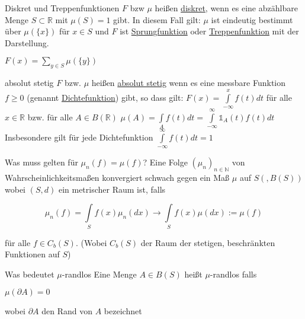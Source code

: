 \documentclass[avery5371,grid,frame]{flashcards} %
\newcommand{\N}{\mathbb{N}}
\newcommand{\R}{\mathbb{R}}
\newcommand{\1}{ \mathbb{1} } %
\begin{document}
\begin{flashcard}[Definition]{Diskret und Treppenfunktionen}
  $F$ bzw $\mu$ heißen \underline{diskret}, wenn es eine abzählbare
  Menge $S \subset \R$ mit $\mu(S)=1$ gibt. In diesem Fall gilt: $\mu$
  ist eindeutig bestimmt über $\mu(\{x\})$ für $x \in S$ und $F$ ist
  \underline{Sprungfunktion} oder \underline{Treppenfunktion} mit der
  Darstellung.
  \begin{center}
    $F(x)=\sum\limits_{y \in S} \mu(\{y\})$
  \end{center}
\end{flashcard}

\begin{flashcard}[Definition]{absolut stetig}
  $F$ bzw. $\mu$ heißen \underline{absolut stetig} wenn es eine
  messbare Funktion $f\geq 0$ (genannt \underline{Dichtefunktion})
  gibt, so dass gilt:
    $F(x)=\int\limits_{-\infty}^xf(t)dt$ für alle $x \in \R$
  bzw. für alle $A \in B(\R)$
    $\mu(A)=\int\limits_A f(t) dt=\int\limits_{-\infty}^\infty
    \1_A(t)f(t)dt$
  Insbesondere gilt für jede Dichtefunktion
    $\int\limits_{-\infty}^\infty f(t)dt=1$
\end{flashcard}

\begin{flashcard}[Definition]{Was muss gelten für $\mu_n(f) = \mu(f)$?}
  Eine Folge $(\mu_n)_{n \in \N}$ von Wahrscheinlichkeitsmaßen konvergiert schwach
  gegen ein Maß $\mu$ auf $S(,B(S))$ wobei $(S,d)$ ein metrischer Raum
  ist, falls
  \begin{center}
    \[\mu_n(f)=\int\limits_S f(x)\mu_n(dx) \to
    \int\limits_Sf(x)\mu(dx):=\mu(f)\]
  \end{center}
  für alle $f \in C_b(S)$. (Wobei $C_b(S)$ der Raum der stetigen, beschränkten Funktionen auf $S$)
\end{flashcard}

\begin{flashcard}[Definition]{Was bedeutet $\mu$-randlos}
  Eine Menge $A \in B(S)$ heißt $\mu$-randlos falls
  \begin{center}
    $\mu(\partial A)=0$ 
  \end{center}
  wobei $\partial A$ den Rand von $A$ bezeichnet
\end{flashcard}
\end{document}
